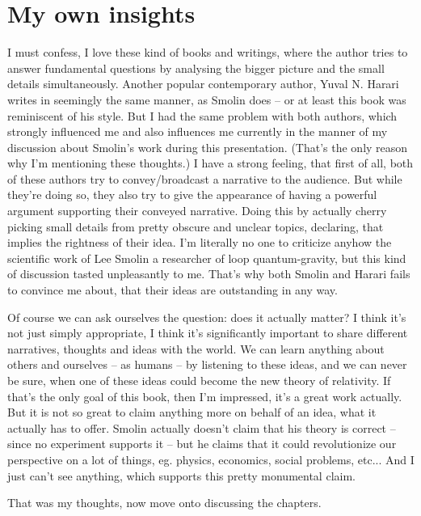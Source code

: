 \section{My own insights}
I must confess, I love these kind of books and writings, where the author tries to answer fundamental questions by analysing the bigger picture and the small details simultaneously. Another popular contemporary author, Yuval N. Harari writes in seemingly the same manner, as Smolin does -- or at least this book was reminiscent of his style. But I had the same problem with both authors, which strongly influenced me and also influences me currently in the manner of my discussion about Smolin's work during this presentation. (That's the only reason why I'm mentioning these thoughts.) I have a strong feeling, that first of all, both of these authors try to convey/broadcast a narrative to the audience. But while they're doing so, they also try to give the appearance of having a powerful argument supporting their conveyed narrative. Doing this by actually cherry picking small details from pretty obscure and unclear topics, declaring, that  implies the rightness of their idea. I'm literally no one to criticize anyhow the scientific work of Lee Smolin a researcher of loop quantum-gravity, but this kind of discussion tasted unpleasantly  to me. That's why both Smolin and Harari fails to convince me about, that their ideas are outstanding in any way. \par
Of course we can ask ourselves the question: does it actually matter? I think it's not just simply appropriate, I think it's significantly important to share different narratives, thoughts and ideas with the world. We can learn anything about others and ourselves -- as humans -- by listening to these ideas, and we can never be sure, when one of these ideas could become the new theory of relativity. If that's the only goal of this book, then I'm impressed, it's a great work actually. But it is not so great to claim anything more on behalf of an idea, what it actually has to offer. Smolin actually doesn't claim that his theory is correct -- since no experiment supports it -- but he claims that it could revolutionize our perspective on a lot of things, eg. physics, economics, social problems, etc... And I just can't see anything, which supports this pretty monumental claim. \par
That was my thoughts, now move onto discussing the chapters.



